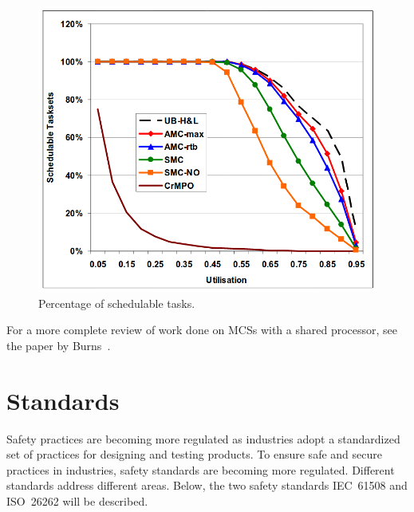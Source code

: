 \begin{figure}[H]
\centering
\includegraphics[width=\textwidth]{./img/literature_schedulers.png}
\caption{Percentage of schedulable tasks.~\cite{baruah2011}}\label{fig:schedulers}
\end{figure}

For a more complete review of work done on MCSs with a shared processor, see the paper by Burns~\cite{burns2016}.




\section{Standards}
Safety practices are becoming more regulated as industries adopt a standardized set of practices for designing and testing products. %
To ensure safe and secure practices in industries, safety standards are becoming more regulated. Different standards address different areas. Below, the two safety standards IEC~61508 and ISO~26262 will be described.

